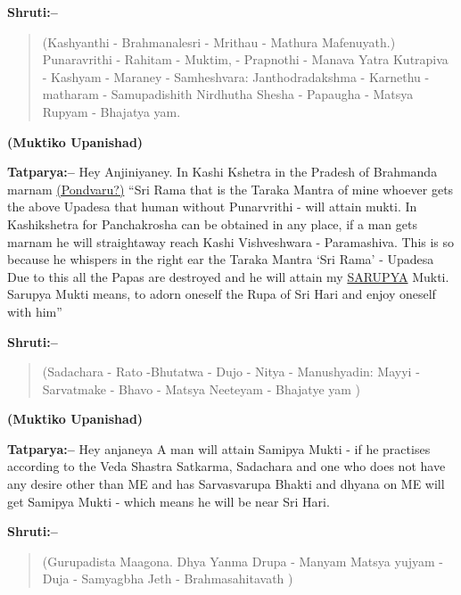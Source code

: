 \newpage

\textbf{Shruti:–}

\begin{verse}
(Kashyanthi - Brahmanalesri - Mrithau - Mathura Mafenu\break yath.) Punaravrithi - Rahitam - Muktim, - Prapnothi - Manava  Yatra Kutrapiva - Kashyam - Maraney - Samheshvara:  Janthodradakshma - Karnethu - matharam - Samupadishith Nirdhutha Shesha - Papaugha - Matsya Rupyam - Bhajatya yam.
\end{verse}

\begin{flushright}
\textbf{(Muktiko Upanishad)}
\end{flushright}

\textbf{Tatparya:–} Hey Anjiniyaney. In Kashi Kshetra in the Pradesh of Brahmanda marnam \underline{(Pondvaru?)} “Sri Rama that is the Taraka Mantra of mine whoever gets the above Upadesa that human without Punarvrithi - will attain mukti. In Kashikshetra for Panchakrosha can be obtained in any place, if a man gets marnam he will straightaway reach Kashi Vishveshwara - Paramashiva. This is so because he whispers in the right ear the Taraka Mantra ‘Sri Rama’ - Upadesa Due to this all the Papas are destroyed and he will attain my \underline{SARUPYA} Mukti. Sarupya Mukti means, to adorn oneself the Rupa of Sri Hari and enjoy oneself with him”

\vskip 4pt

\textbf{Shruti:–}

\begin{verse}
 (Sadachara - Rato -Bhutatwa - Dujo - Nitya - Manushyadin:  Mayyi - Sarvatmake - Bhavo - Matsya Neeteyam - Bhajatye yam )
\end{verse}

\begin{flushright}
\textbf{(Muktiko Upanishad)}
\end{flushright}

\textbf{Tatparya:–} Hey anjaneya  A man will attain Samipya Mukti - if he practises according to the Veda Shastra Satkarma, Sadachara and one who does not have any desire other than ME and has Sarvasvarupa Bhakti and dhyana on ME will get Samipya Mukti - which means he will be near Sri Hari.

\newpage

\textbf{Shruti:–}

\begin{verse}
(Gurupadista Maagona. Dhya Yanma Drupa - Manyam  Matsya yujyam - Duja - Samyagbha Jeth - Brahmasahitavath )
\end{verse}

